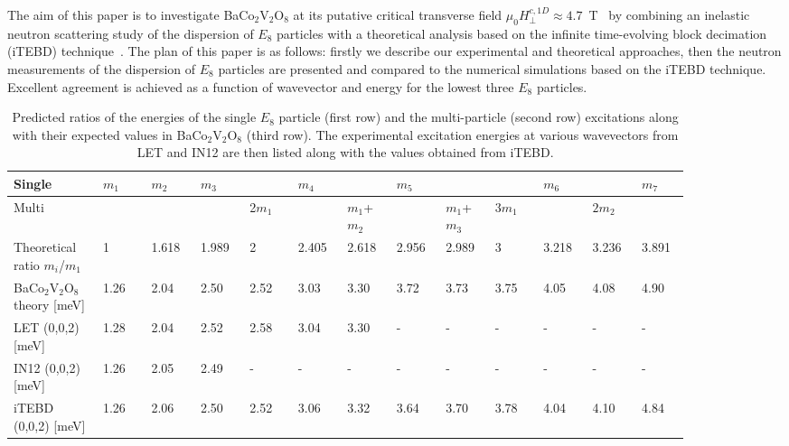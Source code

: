 \documentclass[aps,prl,twocolumn,superscriptaddress,groupedaddress]{revtex4}
\begin{document}
The aim of this paper is to investigate BaCo$_2$V$_2$O$_8$ at its putative critical transverse field $\mu_0 H_{\bot}^{c,1D} \approx 4.7$~T~\cite{Zou_2021} by combining an inelastic neutron scattering study of the dispersion of $E_8$ particles with a theoretical analysis based on the infinite time-evolving block decimation (iTEBD) technique~\cite{PhysRevLett.98.070201}. The plan of this paper is as follows: firstly we describe our experimental and theoretical approaches, then the neutron measurements of the dispersion of $E_8$ particles are presented and compared to the numerical simulations based on the iTEBD technique. Excellent agreement is achieved as a function of wavevector and energy for the lowest three $E_8$ particles.




\begin{table*}[btp]
\caption{Predicted ratios of the energies of the single $E_8$ particle (first row) and the multi-particle (second row) excitations along with their expected values in BaCo$_2$V$_2$O$_8$ (third row). The experimental  excitation energies at various wavevectors from LET and IN12 are then listed along with the values obtained from iTEBD.}
\centering
\begin{tabular}{p{0.11\linewidth}p{0.065\linewidth}p{0.065\linewidth}p{0.065\linewidth}p{0.065\linewidth}p{0.065\linewidth}p{0.065\linewidth}p{0.065\linewidth}p{0.065\linewidth}p{0.065\linewidth}p{0.065\linewidth}p{0.065\linewidth}p{0.05\linewidth}}
\hline \hline
Single & $m_1$ & $m_2$ & $m_3$ & & $m_4$ & & $m_5$ & & & $m_6$ & & $m_7$ \\
\hline
Multi & & & & 2$m_1$ & & $m_1$+$m_2$ & &$m_1$+$m_3$ &3$m_1$ & &$2m_2$  \\
\hline \hline
Theoretical ratio $m_i$/$m_1$ & 1 & 1.618 & 1.989 & 2 & 2.405 & 2.618 & 2.956 & 2.989 & 3 & 3.218 & 3.236 & 3.891 \\
\hline
BaCo$_2$V$_2$O$_8$ theory [meV] & 1.26 & 2.04& 2.50  & 2.52 & 3.03 & 3.30 & 3.72 & 3.73 & 3.75 & 4.05 & 4.08  & 4.90\\
\hline
LET (0,0,2) [meV] & 1.28 & 2.04 & 2.52 & 2.58 & 3.04 & 3.30 & - & - & - & - & - & -\\
\hline
IN12 (0,0,2) [meV] & 1.26 & 2.05 & 2.49 & - & - & - & - & - & - & - & - & - \\
\hline
iTEBD (0,0,2) [meV] & 1.26  & 2.06  & 2.50  & 2.52  & 3.06  &  3.32  & 3.64  & 3.70  & 3.78  & 4.04  & 4.10  & 4.84\\
\hline
\end{tabular}
\end{table*}
\end{document}
